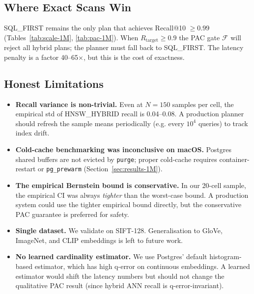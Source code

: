 \documentclass[conference]{IEEEtran}
\begin{document}
\subsection{Where Exact Scans Win}
SQL\_FIRST remains the only plan that achieves Recall@10
$\geq 0.99$ (Tables~\ref{tab:scale-1M}, \ref{tab:pac-1M}).  When
$R_{\text{target}} \geq 0.9$ the PAC gate $\mathcal{F}$ will
reject all hybrid plans; the planner must fall back to
SQL\_FIRST.  The latency penalty is a factor 40--65$\times$, but
this is the cost of exactness.

\subsection{Honest Limitations}
\begin{itemize}
\item \textbf{Recall variance is non-trivial.}  Even at $N = 150$
      samples per cell, the empirical std of HNSW\_HYBRID recall
      is 0.04--0.08.  A production planner should refresh the
      sample means periodically (e.g. every $10^4$ queries) to
      track index drift.
\item \textbf{Cold-cache benchmarking was inconclusive on macOS.}
      Postgres shared buffers are not evicted by \texttt{purge};
      proper cold-cache requires container-restart or
      \texttt{pg\_prewarm} (Section~\ref{sec:results-1M}).
\item \textbf{The empirical Bernstein bound is conservative.}
      In our 20-cell sample, the empirical CI was always
      \emph{tighter} than the worst-case bound.  A production
      system could use the tighter empirical bound directly, but
      the conservative PAC guarantee is preferred for safety.
\item \textbf{Single dataset.}  We validate on SIFT-128.  Generalisation
      to GloVe, ImageNet, and CLIP embeddings is left to future work.
\item \textbf{No learned cardinality estimator.}  We use
      Postgres' default histogram-based estimator, which has high
      q-error on continuous embeddings.  A learned estimator
      would shift the latency numbers but should not change the
      qualitative PAC result (since hybrid ANN recall is
      q-error-invariant).
\end{itemize}
\end{document}
